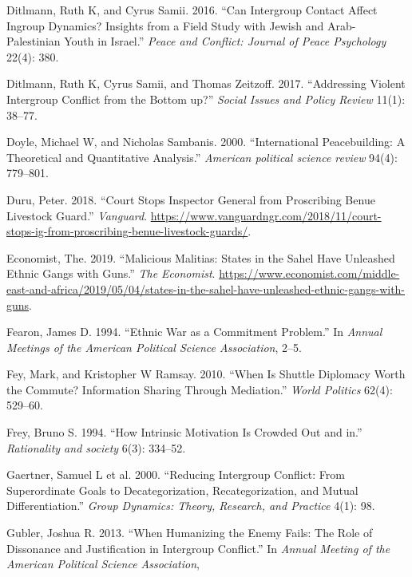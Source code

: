\documentclass[11pt]{article}
\begin{document}
\hypertarget{ref-ditlmann2016can}{}
Ditlmann, Ruth K, and Cyrus Samii. 2016. ``Can Intergroup Contact Affect
Ingroup Dynamics? Insights from a Field Study with Jewish and
Arab-Palestinian Youth in Israel.'' \emph{Peace and Conflict: Journal of
Peace Psychology} 22(4): 380.

\hypertarget{ref-ditlmann2017addressing}{}
Ditlmann, Ruth K, Cyrus Samii, and Thomas Zeitzoff. 2017. ``Addressing
Violent Intergroup Conflict from the Bottom up?'' \emph{Social Issues
and Policy Review} 11(1): 38--77.

\hypertarget{ref-doyle2000international}{}
Doyle, Michael W, and Nicholas Sambanis. 2000. ``International
Peacebuilding: A Theoretical and Quantitative Analysis.'' \emph{American
political science review} 94(4): 779--801.

\hypertarget{ref-duru2018court}{}
Duru, Peter. 2018. ``Court Stops Inspector General from Proscribing
Benue Livestock Guard.'' \emph{Vanguard}.
\url{https://www.vanguardngr.com/2018/11/court-stops-ig-from-proscribing-benue-livestock-guards/}.

\hypertarget{ref-economist2019militias}{}
Economist, The. 2019. ``Malicious Malitias: States in the Sahel Have
Unleashed Ethnic Gangs with Guns.'' \emph{The Economist}.
\url{https://www.economist.com/middle-east-and-africa/2019/05/04/states-in-the-sahel-have-unleashed-ethnic-gangs-with-guns}.

\hypertarget{ref-fearon1994ethnic}{}
Fearon, James D. 1994. ``Ethnic War as a Commitment Problem.'' In
\emph{Annual Meetings of the American Political Science Association},
2--5.

\hypertarget{ref-fey2010shuttle}{}
Fey, Mark, and Kristopher W Ramsay. 2010. ``When Is Shuttle Diplomacy
Worth the Commute? Information Sharing Through Mediation.'' \emph{World
Politics} 62(4): 529--60.

\hypertarget{ref-frey1994intrinsic}{}
Frey, Bruno S. 1994. ``How Intrinsic Motivation Is Crowded Out and in.''
\emph{Rationality and society} 6(3): 334--52.

\hypertarget{ref-gaertner2000reducing}{}
Gaertner, Samuel L et al. 2000. ``Reducing Intergroup Conflict: From
Superordinate Goals to Decategorization, Recategorization, and Mutual
Differentiation.'' \emph{Group Dynamics: Theory, Research, and Practice}
4(1): 98.

\hypertarget{ref-gubler2013humanizing}{}
Gubler, Joshua R. 2013. ``When Humanizing the Enemy Fails: The Role of
Dissonance and Justification in Intergroup Conflict.'' In \emph{Annual
Meeting of the American Political Science Association},
\end{document}
